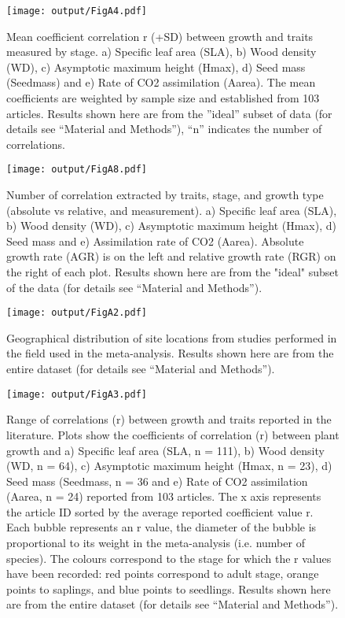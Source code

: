 \documentclass[10pt,twoside]{article}\usepackage[]{graphicx}\usepackage[]{color}
\begin{document}
\begin{figure}[h!]
\centering
\texttt{[image: output/FigA4.pdf]}
\caption{Mean coefficient correlation r (+SD) between growth and traits measured by stage.  a) Specific leaf area (SLA), b) Wood density (WD), c) Asymptotic maximum height (Hmax), d) Seed mass (Seedmass) and e) Rate of CO2 assimilation (Aarea). The mean coefficients are weighted by sample size and established from 103 articles. Results shown here are from the ''ideal'' subset of data (for details see ``Material and Methods''), ``n'' indicates the number of correlations.}
\label{fig:figA4}
\end{figure}



\begin{figure}[h!]
\centering
\texttt{[image: output/FigA8.pdf]}
\caption{Number of correlation extracted by traits, stage, and growth type (absolute vs relative, and measurement). a) Specific leaf area (SLA), b) Wood density (WD), c) Asymptotic maximum height (Hmax), d) Seed mass and e) Assimilation rate of CO2 (Aarea). Absolute growth rate (AGR) is on the left and relative growth rate (RGR) on the right of each plot. Results shown here are from the "ideal" subset of the data (for details see ``Material and Methods''). }
\label{fig:figA8}
\end{figure}



\begin{figure}[h!]
\centering
\texttt{[image: output/FigA2.pdf]}
\caption{Geographical distribution of site locations from studies performed in the field used in the meta-analysis. Results shown here are from the entire dataset (for details see ``Material and Methods'').}
\label{fig:figA2}
\end{figure}


\begin{figure}[h!]
\centering
\texttt{[image: output/FigA3.pdf]}
\caption{Range of correlations (r) between
growth and traits reported in the literature. Plots show the coefficients of correlation (r)
between plant growth and a) Specific leaf area (SLA, n =
111), b) Wood density (WD, n = 64), c) Asymptotic
maximum height (Hmax, n = 23), d) Seed mass (Seedmass, n = 36 and
e) Rate of CO2 assimilation (Aarea, n = 24) reported from 103
articles. The x axis represents the article ID sorted by the average reported coefficient value r. Each bubble represents an r value, the diameter of the bubble is proportional to its weight in the meta-analysis (i.e. number of species). The colours correspond to the stage for which the r values have been recorded: red points correspond to adult stage, orange points to saplings, and blue points to seedlings. Results shown here are from the entire dataset (for details see ``Material and Methods''). }
\label{fig:figA3}
\end{figure}
\end{document}
